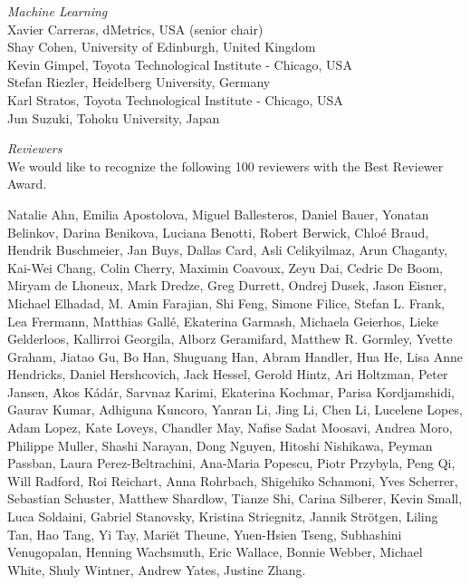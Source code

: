 \emph{Machine Learning} \\
\hspace*{0.2in}Xavier Carreras, dMetrics, USA (senior chair)\\
\hspace*{0.2in}Shay Cohen, University of Edinburgh, United Kingdom\\
\hspace*{0.2in}Kevin Gimpel, Toyota Technological Institute - Chicago, USA\\
\hspace*{0.2in}Stefan Riezler, Heidelberg University, Germany\\
\hspace*{0.2in}Karl Stratos, Toyota Technological Institute - Chicago, USA\\
\hspace*{0.2in}Jun Suzuki, Tohoku University, Japan

\emph{Reviewers} \\
\hspace*{0.2in}We would like to recognize the following 100 reviewers with the Best Reviewer Award.\\

    
    \begin{addmargin}[0.2in]{0em}
Natalie Ahn, Emilia Apostolova, Miguel Ballesteros, Daniel Bauer, Yonatan Belinkov, Darina Benikova, Luciana Benotti, Robert Berwick, Chlo\'e Braud, Hendrik Buschmeier, Jan Buys, Dallas Card, Asli Celikyilmaz, Arun Chaganty, Kai-Wei Chang, Colin Cherry, Maximin Coavoux, Zeyu Dai, Cedric De Boom, Miryam de Lhoneux, Mark Dredze, Greg Durrett, Ondrej Dusek, Jason Eisner, Michael Elhadad, M. Amin Farajian, Shi Feng, Simone Filice, Stefan L. Frank, Lea Frermann, Matthias Gall\'e, Ekaterina Garmash, Michaela Geierhos, Lieke Gelderloos, Kallirroi Georgila, Alborz Geramifard, Matthew R. Gormley, Yvette Graham, Jiatao Gu, Bo Han, Shuguang Han, Abram Handler, Hua He, Lisa Anne Hendricks, Daniel Hershcovich, Jack Hessel, Gerold Hintz, Ari Holtzman, Peter Jansen, \.Akos K\'ad\'ar, Sarvnaz Karimi, Ekaterina Kochmar, Parisa Kordjamshidi, Gaurav Kumar, Adhiguna Kuncoro, Yanran Li, Jing Li, Chen Li, Lucelene Lopes, Adam Lopez, Kate Loveys, Chandler May, Nafise Sadat Moosavi, Andrea Moro, Philippe Muller, Shashi Narayan, Dong Nguyen, Hitoshi Nishikawa, Peyman Passban, Laura Perez-Beltrachini, Ana-Maria Popescu, Piotr Przybyla, Peng Qi, Will Radford, Roi Reichart, Anna Rohrbach, Shigehiko Schamoni, Yves Scherrer, Sebastian Schuster, Matthew Shardlow, Tianze Shi, Carina Silberer, Kevin Small, Luca Soldaini, Gabriel Stanovsky, Kristina Striegnitz, Jannik Str\"otgen, Liling Tan, Hao Tang, Yi Tay, Mari\"et Theune, Yuen-Hsien Tseng, Subhashini Venugopalan, Henning Wachsmuth, Eric Wallace, Bonnie Webber, Michael White, Shuly Wintner, Andrew Yates, Justine Zhang. 
    \end{addmargin}

